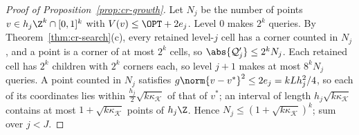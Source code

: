 \begin{proof}[Proof of Proposition~\ref{prop:cr-growth}]
Let $N_j$ be the number of points $v\in h_j\Z^k\cap[0,1]^k$ with
$V(v)\le\OPT+2e_j$. Level $0$ makes $2^k$ queries. By
Theorem~\ref{thm:cr-search}(c), every retained level-$j$ cell has a corner
counted in $N_j$, and a point is a corner of at most $2^k$ cells, so
$\abs{\mathcal Q_j'}\le2^kN_j$. Each retained cell has $2^k$ children with
$2^k$ corners each, so level $j+1$ makes at most $8^kN_j$ queries. A point
counted in $N_j$ satisfies $g\norm{v-v^*}^2\le2e_j=kLh_j^2/4$, so each of
its coordinates lies within $\frac{h_j}2\sqrt{k\kappa_{\mathcal K}}$ of that
of $v^*$; an interval of length $h_j\sqrt{k\kappa_{\mathcal K}}$ contains at
most $1+\sqrt{k\kappa_{\mathcal K}}$ points of $h_j\Z$. Hence
$N_j\le(1+\sqrt{k\kappa_{\mathcal K}})^k$; sum over $j<J$.
\end{proof}
